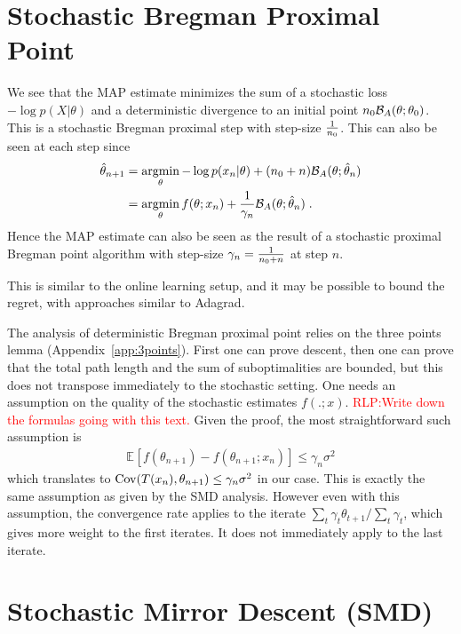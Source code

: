 \documentclass{article}
\newcommand{\RLP}[1]{\textcolor{red}{RLP:#1}}
\newcommand*{\expect}[2][]{\ensuremath{\mathbb{E}_{#1} \left[ #2 \right] }} %
\newcommand{\logpart}{A}
\newcommand{\bregman}{\cB_\logpart}
\newcommand{\natp}{\theta}
\newcommand{\lr}{\gamma} %
\begin{document}
\section{Stochastic Bregman Proximal Point}
We see that the MAP estimate minimizes the sum of a stochastic loss $ -\log p(X|\natp)$ and a deterministic divergence to an initial point $n_0 \bregman(\natp ; \natp_0)$. This is a stochastic Bregman proximal step with step-size $\frac{1}{n_0}$. This can also be seen at each step since
\begin{align}
    \hat \natp_{n+1} 
    &= \argmin_\natp -\log p(x_{n}|\natp) + (n_0 + n) \bregman(\natp ; \hat \natp_n) \\
    &= \argmin_\natp f(\natp; x_{n}) +  \inv{\gamma_{n}}\bregman(\natp ; \hat \natp_n) \; .
\end{align}
Hence the MAP estimate can also be seen as the result of a stochastic proximal Bregman point algorithm with step-size $\gamma_n = \frac{1}{n_0 + n}$ at step $n$.

This is similar to the online learning setup, and it may be possible to bound the regret, with approaches similar to Adagrad.

The analysis of deterministic Bregman proximal point relies on the three points lemma (Appendix~\ref{app:3points}). First one can prove descent, then one can prove that the total path length and the sum of suboptimalities are bounded, but this does not transpose immediately to the stochastic setting. One needs an assumption on the quality of the stochastic estimates $f(. ; x)$. 
\RLP{Write down the formulas going with this text.}
Given the proof, the most straightforward such assumption is 
\begin{align}
\expect{f(\natp_{n+1}) - f(\natp_{n+1} ; x_{n})} \leq \gamma_n \sigma^2
\end{align}
which translates to $\Cov(T(x_{n}) , \natp_{n+1}) \leq  \gamma_n \sigma^2$ in our case. This is exactly the same assumption as given by the SMD analysis. However even with this assumption, the convergence rate applies to the iterate $\sum_t \lr_t \natp_{t+1} / \sum_t \lr_t$, which gives more weight to the first iterates. It does not immediately apply to the last iterate.


\section{Stochastic Mirror Descent (SMD)}
\end{document}
